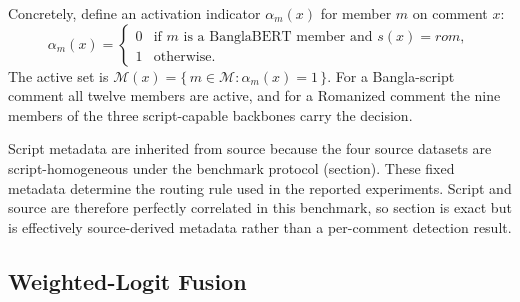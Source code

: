 \documentclass[11pt,a4paper]{article}
\def\cref#1{section}%
\def\textsc#1{#1}%
\begin{document}
Concretely, define an activation indicator $\alpha_m(x)$ for member $m$ on comment $x$:
\begin{equation}
\alpha_m(x) =
\begin{cases}
0 & \text{if } m \text{ is a BanglaBERT member and } s(x) = \textsc{rom},\\
1 & \text{otherwise.}
\end{cases}
\label{eq:activation}
\end{equation}
The active set is $\mathcal{M}(x) = \{\, m \in \mathcal{M} : \alpha_m(x) = 1 \,\}$. For a Bangla-script comment all twelve members are active, and for a Romanized comment the nine members of the three script-capable backbones carry the decision.

Script metadata are inherited from source because the four source datasets are script-homogeneous under the benchmark protocol (\cref{sec:splits}). These fixed metadata determine the routing rule used in the reported experiments. Script and source are therefore perfectly correlated in this benchmark, so \cref{eq:activation} is exact but is effectively source-derived metadata rather than a per-comment detection result.

\subsection{Weighted-Logit Fusion}
\label{sec:fusion}
\end{document}

